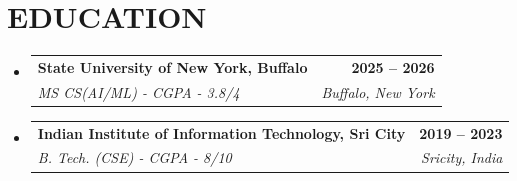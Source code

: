 \documentclass[letterpaper,11pt]{article}
\makeatletter
\newcommand{\resumeSubheading}[4]{\vspace{-2pt}\item\begin{tabular*}{1.0\textwidth}[t]{l@{\extracolsep{\fill}}r}\textbf{\large#1} & \textbf{\small #2} \\ \textit{\large#3} & \textit{\small #4} \\ \end{tabular*}\vspace{-7pt}}
\newcommand{\resumeSubHeadingListStart}{\begin{itemize}[leftmargin=0.0in, label={}]}
\newcommand{\resumeSubHeadingListEnd}{\end{itemize}}
\makeatother
\begin{document}
\section{EDUCATION}
  \resumeSubHeadingListStart
    \resumeSubheading
      {State University of New York, Buffalo}{2025 -- 2026}
      {MS CS(AI/ML) - CGPA - 3.8/4}{Buffalo, New York}
    \resumeSubheading
      {Indian Institute of Information Technology, Sri City}{2019 -- 2023}
      {B. Tech. (CSE) - CGPA - 8/10}{Sricity, India}
  \resumeSubHeadingListEnd
\end{document}
